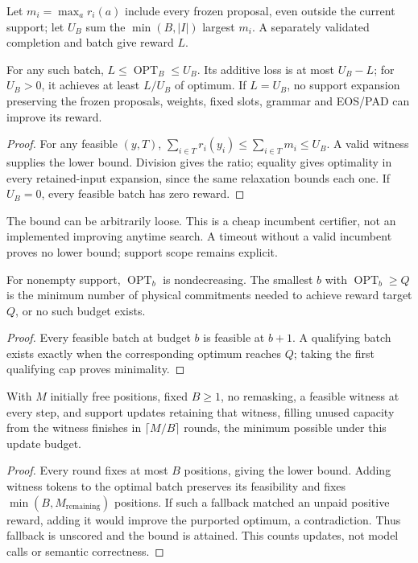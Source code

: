 Let $m_i=\max_a r_i(a)$ include every frozen proposal, even outside the current support; let $U_B$ sum the $\min(B,|I|)$ largest $m_i$. A separately validated completion and batch give reward $L$.
\begin{theorem}
For any such batch, $L\leq\operatorname{OPT}_B\leq U_B$. Its additive loss is at most $U_B-L$; for $U_B>0$, it achieves at least $L/U_B$ of optimum. If $L=U_B$, no support expansion preserving the frozen proposals, weights, fixed slots, grammar and EOS/PAD can improve its reward.
\label{thm:quality-bound}
\end{theorem}
\begin{proof}
For any feasible $(y,T)$, $\sum_{i\in T}r_i(y_i)\leq\sum_{i\in T}m_i\leq U_B$. A valid witness supplies the lower bound. Division gives the ratio; equality gives optimality in every retained-input expansion, since the same relaxation bounds each one. If $U_B=0$, every feasible batch has zero reward.
\end{proof}
The bound can be arbitrarily loose. This is a cheap incumbent certifier, not an implemented improving anytime search. A timeout without a valid incumbent proves no lower bound; support scope remains explicit.


\begin{corollary}
For nonempty support, $\operatorname{OPT}_b$ is nondecreasing. The smallest $b$ with $\operatorname{OPT}_b\geq Q$ is the minimum number of physical commitments needed to achieve reward target $Q$, or no such budget exists.
\end{corollary}
\begin{proof}
Every feasible batch at budget $b$ is feasible at $b+1$. A qualifying batch exists exactly when the corresponding optimum reaches $Q$; taking the first qualifying cap proves minimality.
\end{proof}

\begin{proposition}
With $M$ initially free positions, fixed $B\geq1$, no remasking, a feasible witness at every step, and support updates retaining that witness, filling unused capacity from the witness finishes in $\lceil M/B\rceil$ rounds, the minimum possible under this update budget.
\end{proposition}
\begin{proof}
Every round fixes at most $B$ positions, giving the lower bound. Adding witness tokens to the optimal batch preserves its feasibility and fixes $\min(B,M_{\mathrm{remaining}})$ positions. If such a fallback matched an unpaid positive reward, adding it would improve the purported optimum, a contradiction. Thus fallback is unscored and the bound is attained. This counts updates, not model calls or semantic correctness.
\end{proof}
